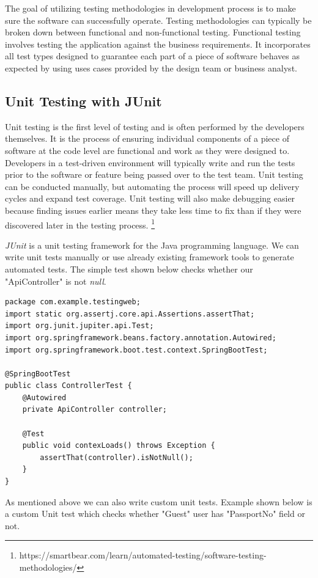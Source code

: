 The goal of utilizing testing methodologies in development process is to make sure the software can successfully operate.
Testing methodologies can typically be broken down between functional and non-functional testing. Functional testing involves testing the application against the business requirements. It incorporates all test types designed to guarantee each part of a piece of software behaves as expected by using uses cases provided by the design team or business analyst.


\subsection{Unit Testing with JUnit}
Unit testing is the first level of testing and is often performed by the developers themselves. It is the process of ensuring individual components of a piece of software at the code level are functional and work as they were designed to. Developers in a test-driven environment will typically write and run the tests prior to the software or feature being passed over to the test team. Unit testing can be conducted manually, but automating the process will speed up delivery cycles and expand test coverage. Unit testing will also make debugging easier because finding issues earlier means they take less time to fix than if they were discovered later in the testing process. \footnote{https://smartbear.com/learn/automated-testing/software-testing-methodologies/}

\textit{JUnit} is a unit testing framework for the Java programming language. We can write unit tests manually or use already existing framework tools to generate automated tests.
The simple test shown below checks whether our "ApiController" is not \textit{null}.

\begin{verbatim}
package com.example.testingweb;
import static org.assertj.core.api.Assertions.assertThat;
import org.junit.jupiter.api.Test;
import org.springframework.beans.factory.annotation.Autowired;
import org.springframework.boot.test.context.SpringBootTest;

@SpringBootTest
public class ControllerTest {
	@Autowired
	private ApiController controller;

	@Test
	public void contexLoads() throws Exception {
		assertThat(controller).isNotNull();
	}
}    
\end{verbatim}

As mentioned above we can also write custom unit tests. Example shown below is a custom Unit test which checks whether "Guest" user has "PassportNo" field or not.

